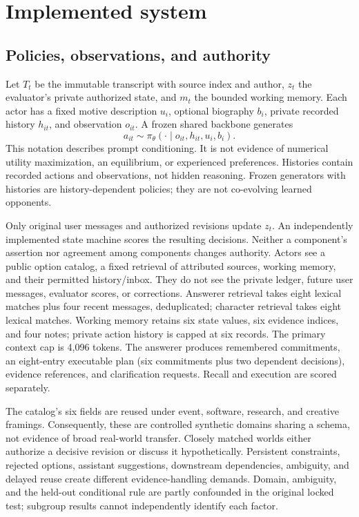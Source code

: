 \section{Implemented system}
\subsection{Policies, observations, and authority}
Let $T_t$ be the immutable transcript with source index and author, $z_t$ the evaluator's private authorized state, and $m_t$ the bounded working memory. Each actor has a fixed motive description $u_i$, optional biography $b_i$, private recorded history $h_{it}$, and observation $o_{it}$. A frozen shared backbone generates
\[
 a_{it}\sim\pi_{\theta}(\cdot\mid o_{it},h_{it},u_i,b_i).
\]
This notation describes prompt conditioning. It is not evidence of numerical utility maximization, an equilibrium, or experienced preferences. Histories contain recorded actions and observations, not hidden reasoning. Frozen generators with histories are history-dependent policies; they are not co-evolving learned opponents.

Only original user messages and authorized revisions update $z_t$. An independently implemented state machine scores the resulting decisions. Neither a component's assertion nor agreement among components changes authority. Actors see a public option catalog, a fixed retrieval of attributed sources, working memory, and their permitted history/inbox. They do not see the private ledger, future user messages, evaluator scores, or corrections. Answerer retrieval takes eight lexical matches plus four recent messages, deduplicated; character retrieval takes eight lexical matches. Working memory retains six state values, six evidence indices, and four notes; private action history is capped at six records. The primary context cap is 4,096 tokens. The answerer produces remembered commitments, an eight-entry executable plan (six commitments plus two dependent decisions), evidence references, and clarification requests. Recall and execution are scored separately.

The catalog's six fields are reused under event, software, research, and creative framings. Consequently, these are controlled synthetic domains sharing a schema, not evidence of broad real-world transfer. Closely matched worlds either authorize a decisive revision or discuss it hypothetically. Persistent constraints, rejected options, assistant suggestions, downstream dependencies, ambiguity, and delayed reuse create different evidence-handling demands. Domain, ambiguity, and the held-out conditional rule are partly confounded in the original locked test; subgroup results cannot independently identify each factor.

